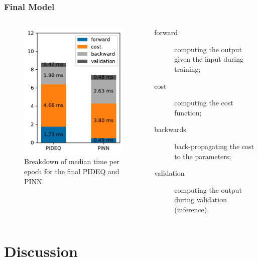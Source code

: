 \documentclass[t]{beamer}
\begin{document}
\begin{frame}
    \frametitle{Final Model}
    \begin{columns}[T] 
	\begin{column}{.6\textwidth}
	    \vspace{-10pt}
	    \begin{figure}[h]
	        \centering
		\includegraphics[width=.6\textwidth]{../images/final_times.pdf}
		\caption{Breakdown of median time per epoch for the final PIDEQ and PINN.}
		\label{fig:final-times}
	    \end{figure}
        \end{column}
	\begin{column}{.4\textwidth} 
	    \begin{description}
	        \item[forward] computing the output given the input during training;
		\item[cost] computing the cost function;
		\item[backwards] back-propagating the cost to the parameters;
		\item[validation] computing the output during validation (inference).
	    \end{description}
	\end{column}
    \end{columns}
    
\end{frame}

\section{Discussion}
\end{document}
